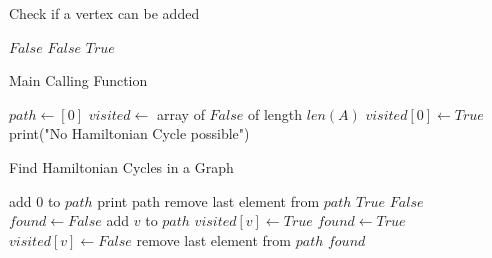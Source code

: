 \documentclass{article}
\begin{document}
    \begin{algorithm}
        \caption{Check if a vertex can be added}
        \begin{algorithmic}[1]
                    \State \Return $False$
                \EndIf
                    \State \Return $False$
                \EndIf
                \State \Return $True$
            \EndFunction
        \end{algorithmic}
    \end{algorithm}

    \begin{algorithm}
        \caption{Main Calling Function}
        \begin{algorithmic}[1]
            \State $path \gets [0]$
            \State $visited \gets$ array of $False$ of length $len(A)$
            \State $visited[0] \gets True$
                \State print("No Hamiltonian Cycle possible")
            \EndIf
        \EndFunction
        \end{algorithmic}
    \end{algorithm}
        
    \begin{algorithm}
        \caption{Find Hamiltonian Cycles in a Graph}
        \begin{algorithmic}[1]
                    \State add $0$ to $path$
                    \State print path
                    \State remove last element from $path$
                    \State \Return $True$
                \Else
                    \State \Return $False$
                \EndIf
            \EndIf
            \State $found \gets False$
                    \State add $v$ to $path$
                    \State $visited[v] \gets True$
                        \State $found \gets True$
                    \EndIf
                    \State $visited[v] \gets False$
                    \State remove last element from $path$
                \EndIf
            \EndFor
            \State \Return $found$
        \EndFunction
        \end{algorithmic}
        \end{algorithm}
        
\end{document}

